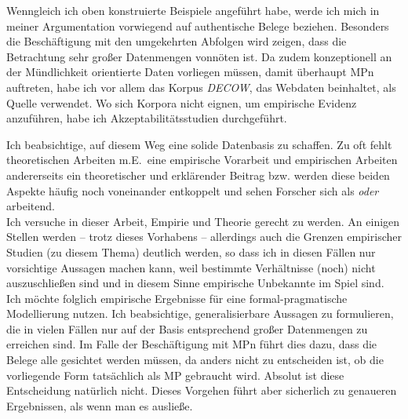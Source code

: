 \noindent
Wenngleich ich oben konstruierte Beispiele angeführt habe, werde ich mich in meiner Argumentation vorwiegend auf authentische Belege beziehen. Besonders die Beschäftigung mit den umgekehrten Abfolgen wird zeigen, dass die Betrachtung sehr großer Datenmengen vonnöten ist. Da zudem konzeptionell an der Mündlichkeit orientierte Daten vorliegen müssen, damit überhaupt MPn auftreten, habe ich vor allem das Korpus \textit{DECOW}, das Webdaten beinhaltet, als Quelle verwendet. Wo sich Korpora nicht eignen, um empirische Evidenz anzufüh\-ren, habe ich Akzeptabilitätsstudien durchgeführt. 

Ich beabsichtige, auf diesem Weg eine solide Datenbasis zu schaffen. Zu oft fehlt theoretischen Arbeiten m.E.\ eine empirische Vorarbeit und empirischen Arbeiten andererseits ein theoretischer und erklärender Beitrag bzw. werden diese beiden Aspekte häufig noch voneinander entkoppelt und sehen Forscher sich als  \emph{oder}  arbeitend. \\

\noindent
Ich versuche in dieser Arbeit, Empirie und Theorie gerecht zu werden. An einigen Stellen werden – trotz dieses Vorhabens – allerdings auch die Grenzen empirischer Studien (zu diesem Thema) deutlich werden, so dass ich in diesen Fällen nur vorsichtige Aussagen machen kann, weil bestimmte Verhältnisse (noch) nicht auszuschließen sind und in diesem Sinne empirische Unbekannte im Spiel sind.\\

\noindent
Ich möchte folglich empirische Ergebnisse für eine formal-pragmatische Modellierung nutzen. Ich beabsichtige, generalisierbare Aussagen zu formulieren, die in vielen Fällen nur auf der Basis entsprechend großer Datenmengen zu errei\-chen sind. Im Falle der Beschäftigung mit MPn führt dies dazu, dass die Belege alle gesichtet werden müssen, da anders nicht zu entscheiden ist, ob die vorliegende Form tatsächlich als MP gebraucht wird. Absolut ist diese Entscheidung natürlich nicht. Dieses Vorgehen führt aber sicherlich zu genaueren Ergebnissen, als wenn man es ausließe.\\


